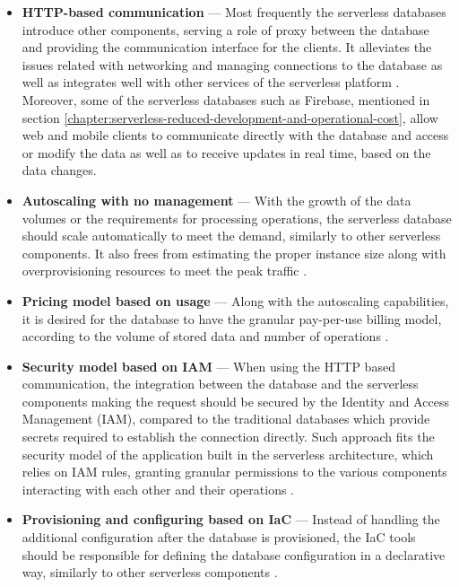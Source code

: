 \begin{itemize}
   \item \textbf{HTTP-based communication} ---
   Most frequently the serverless databases introduce other components, serving a role of proxy between the database and providing the communication interface for the clients.
   It alleviates the issues related with networking and managing connections to the database as well as integrates well with other services of the serverless platform \cite{PickingDatabaseForYourServerlessApplicationIn2021}.
   Moreover, some of the serverless databases such as Firebase, mentioned in section \ref{chapter:serverless-reduced-development-and-operational-cost}, allow web and mobile clients to communicate directly with the database and access or modify the data as well as to receive updates in real time, based on the data changes.
  
   \item \textbf{Autoscaling with no management} ---
   With the growth of the data volumes or the requirements for processing operations, the serverless database should scale automatically to meet the demand, similarly to other serverless components.
   It also frees from estimating the proper instance size along with overprovisioning resources to meet the peak traffic \cite{WhatFrontEndDevelopersNeedToKnowAboutServerlessDatabases}.
  
   \item \textbf{Pricing model based on usage} ---
   Along with the autoscaling capabilities, it is desired for the database to have the granular pay-per-use billing model, according to the volume of stored data and number of operations \cite{WhatFrontEndDevelopersNeedToKnowAboutServerlessDatabases}.

   \item \textbf{Security model based on IAM} ---
   When using the HTTP based communication, the integration between the database and the serverless components making the request should be secured by the Identity and Access Management (IAM), compared to the traditional databases which provide secrets required to establish the connection directly.
   Such approach fits the security model of the application built in the serverless architecture, which relies on IAM rules, granting granular permissions to the various components interacting with each other and their operations \cite{PickingDatabaseForYourServerlessApplicationIn2021}.

   \item \textbf{Provisioning and configuring based on IaC} ---
   Instead of handling the additional configuration after the database is provisioned, the IaC tools should be responsible for defining the database configuration in a declarative way, similarly to other serverless components \cite{PickingDatabaseForYourServerlessApplicationIn2021}.


\end{itemize}
